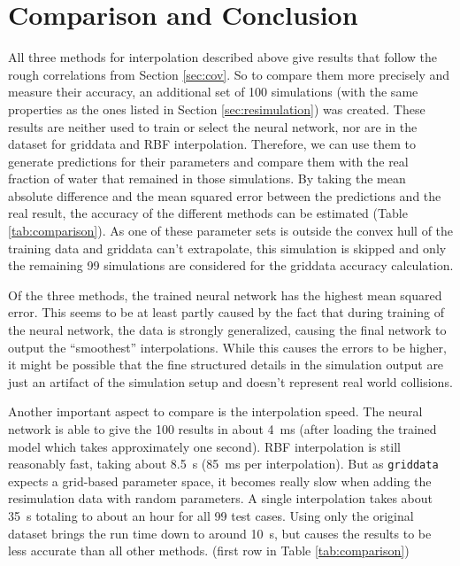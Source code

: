 \chapter{Comparison and Conclusion}
\label{sec:comparison}

All three methods for interpolation described above give results that follow the rough correlations from Section \ref{sec:cov}. So to compare them more precisely and measure their accuracy, an additional set of 100 simulations (with the same properties as the ones listed in Section \ref{sec:resimulation}) was created. These results are neither used to train or select the neural network, nor are in the dataset for griddata and RBF interpolation. Therefore, we can use them to generate predictions for their parameters and compare them with the real fraction of water that remained in those simulations. By taking the mean absolute difference and the mean squared error between the predictions and the real result, the accuracy of the different methods can be estimated (Table \ref{tab:comparison}). As one of these parameter sets is outside the convex hull of the training data and griddata can't extrapolate, this simulation is skipped and only the remaining 99 simulations are considered for the griddata accuracy calculation. 

Of the three methods, the trained neural network has the highest mean squared error. This seems to be at least partly caused by the fact that during training of the neural network, the data is strongly generalized, causing the final network to output the \enquote{smoothest} interpolations. While this causes the errors to be higher, it might be possible that the fine structured details in the simulation output are just an artifact of the simulation setup and doesn't represent real world collisions.


Another important aspect to compare is the interpolation speed. The neural network is able to give the 100 results in about \SI{4}{\milli\second} (after loading the trained model which takes approximately one second). RBF interpolation is still reasonably fast, taking about \SI{8.5}{\second} (\SI{85}{\milli\second} per interpolation). But as \texttt{griddata} expects a grid-based parameter space, it becomes really slow when adding the resimulation data with random parameters. A single interpolation takes about \SI{35}{\second} totaling to about an hour for all 99 test cases. Using only the original dataset brings the run time down to around \SI{10}{\second}, but causes the results to be less accurate than all other methods. (first row in Table \ref{tab:comparison})

